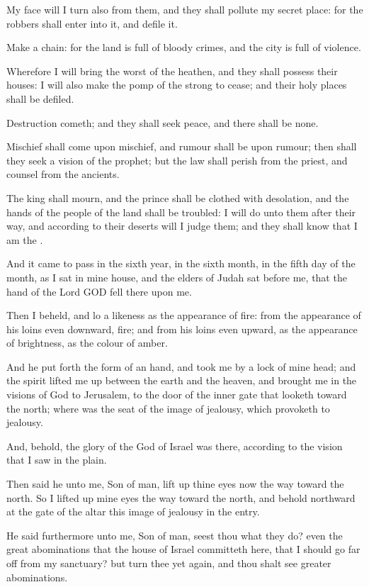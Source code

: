 \Verse My face will I turn also from them, and they shall pollute my secret place: for the robbers shall enter into it, and defile it.

\Verse Make a chain: for the land is full of bloody crimes, and the city is full of violence.

\Verse Wherefore I will bring the worst of the heathen, and they shall possess their houses: I will also make the pomp of the strong to cease; and their holy places shall be defiled.

\Verse Destruction cometh; and they shall seek peace, and there shall be none.

\Verse Mischief shall come upon mischief, and rumour shall be upon rumour; then shall they seek a vision of the prophet; but the law shall perish from the priest, and counsel from the ancients.

\Verse The king shall mourn, and the prince shall be clothed with desolation, and the hands of the people of the land shall be troubled: I will do unto them after their way, and according to their deserts will I judge them; and they shall know that I am the \LORD.


\Chapter
\Verse And it came to pass in the sixth year, in the sixth month, in the fifth day of the month, as I sat in mine house, and the elders of Judah sat before me, that the hand of the Lord GOD fell there upon me.

\Verse Then I beheld, and lo a likeness as the appearance of fire: from the appearance of his loins even downward, fire; and from his loins even upward, as the appearance of brightness, as the colour of amber.

\Verse And he put forth the form of an hand, and took me by a lock of mine head; and the spirit lifted me up between the earth and the heaven, and brought me in the visions of God to Jerusalem, to the door of the inner gate that looketh toward the north; where was the seat of the image of jealousy, which provoketh to jealousy.

\Verse And, behold, the glory of the God of Israel was there, according to the vision that I saw in the plain.

\Verse Then said he unto me, Son of man, lift up thine eyes now the way toward the north. So I lifted up mine eyes the way toward the north, and behold northward at the gate of the altar this image of jealousy in the entry.

\Verse He said furthermore unto me, Son of man, seest thou what they do?  even the great abominations that the house of Israel committeth here, that I should go far off from my sanctuary? but turn thee yet again, and thou shalt see greater abominations.

